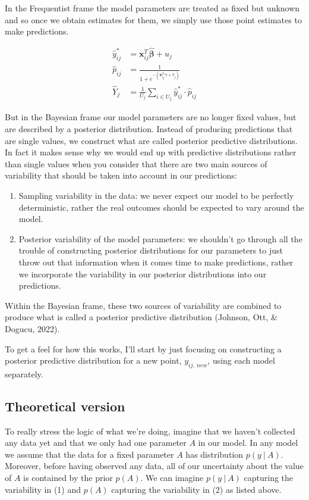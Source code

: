 \documentclass[12pt,twoside]{reedthesis}
\begin{document}
In the Frequentist frame the model parameters are treated as fixed but unknown and so once we obtain estimates for them, we simply use those point estimates to make predictions.

\[
\begin{aligned}
\hat{y}^*_{ij} &= \mathbf{x}_{ij}^T\hat{\boldsymbol{\beta}} + \hat{u}_j \\
\hat{p}_{ij} &= \frac{1}{1 + e^{-(\mathbf{x}_{ij}^T\hat{\boldsymbol{\gamma}} + \hat{v}_j)}} \\
\hat{Y}_{j} &= \frac{1}{U_j}\sum_{i\in U_j}\hat{y}^*_{ij}\cdot \hat{p}_{ij} 
\end{aligned}
\]

But in the Bayesian frame our model parameters are no longer fixed values, but are described by a posterior distribution. Instead of producing predictions that are single values, we construct what are called posterior predictive distributions. In fact it makes sense why we would end up with predictive distributions rather than single values when you consider that there are two main sources of variability that should be taken into account in our predictions:
\begin{enumerate}
\def\labelenumi{\arabic{enumi}.}
\item
  Sampling variability in the data: we never expect our model to be perfectly deterministic, rather the real outcomes should be expected to vary around the model.
\item
  Posterior variability of the model parameters: we shouldn't go through all the trouble of constructing posterior distributions for our parameters to just throw out that information when it comes time to make predictions, rather we incorporate the variability in our posterior distributions into our predictions.
\end{enumerate}
Within the Bayesian frame, these two sources of variability are combined to produce what is called a posterior predictive distribution (Johnson, Ott, \& Dogucu, 2022).

To get a feel for how this works, I'll start by just focusing on constructing a posterior predictive distribution for a new point, \(y_{ij, \ new}\), using each model separately.

\hypertarget{predtheory}{%
\subsection{Theoretical version}\label{predtheory}}

To really stress the logic of what we're doing, imagine that we haven't collected any data yet and that we only had one parameter \(A\) in our model. In any model we assume that the data for a fixed parameter \(A\) has distribution \(p(y \ | \ A)\). Moreover, before having observed any data, all of our uncertainty about the value of \(A\) is contained by the prior \(p(A)\). We can imagine \(p(y \ | \ A)\) capturing the variability in (1) and \(p(A)\) capturing the variability in (2) as listed above.
\end{document}
